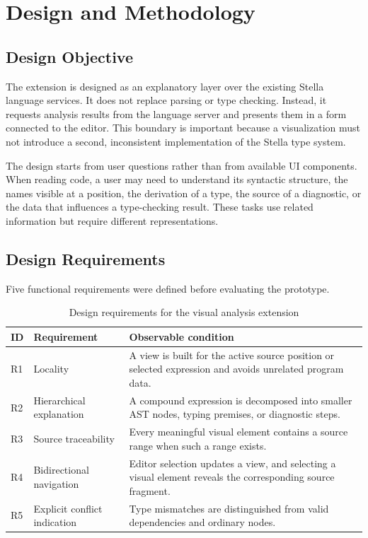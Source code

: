 ﻿\chapter{Design and Methodology}
\label{chap:design}

\section{Design Objective}

The extension is designed as an explanatory layer over the existing Stella language services. It does not replace parsing or type checking. Instead, it requests analysis results from the language server and presents them in a form connected to the editor. This boundary is important because a visualization must not introduce a second, inconsistent implementation of the Stella type system.

The design starts from user questions rather than from available UI components. When reading code, a user may need to understand its syntactic structure, the names visible at a position, the derivation of a type, the source of a diagnostic, or the data that influences a type-checking result. These tasks use related information but require different representations.

\section{Design Requirements}

Five functional requirements were defined before evaluating the prototype.

\begin{table}[htbp]
\centering
\caption{Design requirements for the visual analysis extension}
\label{tab:design-requirements}
\begin{tabular}{p{1.2cm}p{4.0cm}p{8.0cm}}
\toprule
\textbf{ID} & \textbf{Requirement} & \textbf{Observable condition} \\
\midrule
R1 & Locality & A view is built for the active source position or selected expression and avoids unrelated program data. \\
R2 & Hierarchical explanation & A compound expression is decomposed into smaller AST nodes, typing premises, or diagnostic steps. \\
R3 & Source traceability & Every meaningful visual element contains a source range when such a range exists. \\
R4 & Bidirectional navigation & Editor selection updates a view, and selecting a visual element reveals the corresponding source fragment. \\
R5 & Explicit conflict indication & Type mismatches are distinguished from valid dependencies and ordinary nodes. \\
\bottomrule
\end{tabular}
\end{table}


